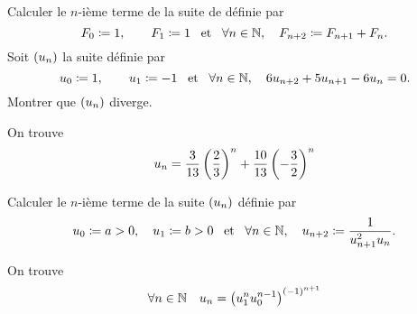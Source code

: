 \documentclass{magnolia}
\begin{document}
\begin{preuve}




\end{preuve}


\begin{exos}
\exo Calculer le $n$-ième terme de la suite de  définie par
  \[F_0\coloneqq 1, \qquad F_1\coloneqq 1 \quad\!\text{et}\quad\! \forall n\in\mathbb{N} ,\quad F_{n+2}\coloneqq F_{n+1}+F_n.\]
\exo Soit $\left(u_n\right)$ la suite définie par
  \[u_0\coloneqq 1, \qquad u_1\coloneqq -1 \quad\!\text{et}\quad\! \forall n\in\mathbb{N} ,\quad 6u_{n+2}+5u_{n+1}-6u_n=0.\]
  Montrer que $\left(u_n\right)$ diverge.
  \begin{sol}
  On trouve
  \[u_n=\frac{3}{13}\left(\frac{2}{3}\right)^n+\frac{10}{13}\left(-\frac{3}{2}\right)^n\]
  \end{sol}
\exo Calculer le $n$-ième terme de la suite $\left(u_n\right)$ définie par
  \[u_0\coloneqq a>0, \quad u_1\coloneqq b>0 \quad\!\text{et}\quad\! \forall n\in\mathbb{N} ,\quad u_{n+2}\coloneqq\frac{1}{u_{n+1}^2u_n}.\]
  \begin{sol}
  On trouve
  \[\forall n\in\mathbb{N} \quad u_n=\left(u_1^n u_0^{n-1}\right)^{\left(-1\right)^{n+1}}\]
  \end{sol}
\end{exos}
\end{document}
